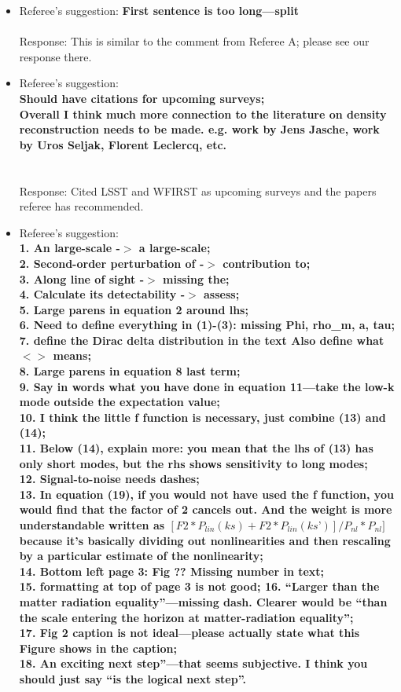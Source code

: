 \documentclass{article}
\begin{document}
\begin{itemize}
\item Referee's suggestion: \textbf{First sentence is too long—split}
\\ \\Response: This is similar to the comment from Referee A; please see our response there.
\item Referee's suggestion: \textbf{\\Should have citations for upcoming surveys;\\ Overall I think much more connection to the literature on density reconstruction needs to be made. e.g. work by Jens Jasche, work by Uros Seljak, Florent Leclercq, etc. \\}
\\ \\Response: Cited LSST and WFIRST as upcoming surveys and the papers referee has recommended.
\item Referee's suggestion: \textbf{\\1. An large-scale -$>$ a large-scale;\\2. Second-order perturbation of -$>$ contribution to; \\3. Along line of sight -$>$ missing the; \\4. Calculate its detectability -$>$ assess; \\ 5. Large parens in equation 2 around lhs; \\ 6. Need to define everything in (1)-(3): missing Phi, rho\_m, a, tau; \\7. define the Dirac delta distribution in the text
Also define what $<>$ means;\\ 8. Large parens in equation 8 last term;\\ 9. Say in words what you have done in equation 11—take the low-k mode outside the
expectation value; \\
10. I think the little f function is necessary, just combine (13) and (14); \\ 11. Below (14), explain more: you mean that the lhs of (13) has only short modes, but the
rhs shows sensitivity to long modes; \\ 12. Signal-to-noise needs dashes;\\ 13. In equation (19), if you would not have used the f function, you would find that the factor of 2 cancels out. And the weight is more understandable written as
$[F2*P_{lin}(ks) + F2*P_{lin}(ks’)]/P_{nl}*P_{nl}]$ because it’s basically dividing out nonlinearities
and then rescaling by a particular estimate of the nonlinearity;\\ 14. Bottom left page 3: Fig ?? Missing number in text;\\ 15. formatting at top of page 3 is not good; 16. “Larger than the matter radiation equality”—missing dash. Clearer would be “than the scale entering the horizon at matter-radiation equality”; \\17. Fig 2 caption is not ideal—please actually state what this Figure shows in the caption; \\18. An exciting next step”—that seems subjective. I think you should just say “is the logical next step”.}

\end{itemize}
\end{document}
